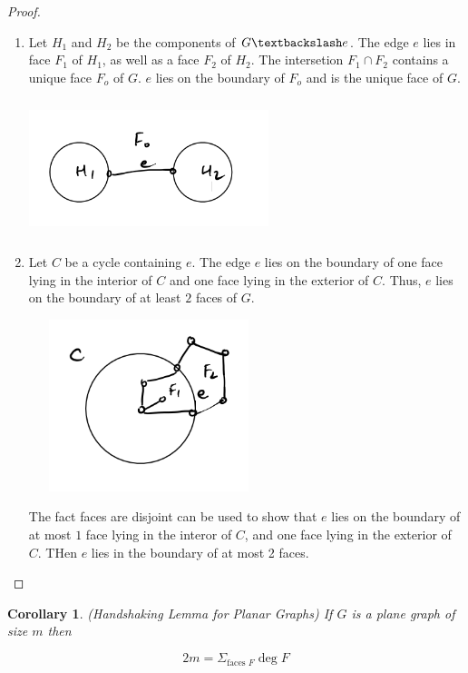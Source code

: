 \documentclass[12pt]{article}
\newtheorem*{corollary}{Corollary}
\newenvironment{pro}{\begin{proof}}{\end{proof}}
\begin{document}
\begin{pro}
\begin{enumerate}
  \item Let $H_{1}$ and $H_{2}$ be the components of $G\textbackslash e$. The edge $e$ lies in face $F_{1}$ of $H_{1}$, as well as a face $F_{2}$ of $H_{2}$.
        The intersetion $F_{1}\cap F_{2}$ contains a unique face $F_{o}$ of $G$. $e$ lies on the boundary of $F_{o}$ and is the unique face of $G$.

        \includegraphics[width=7cm, height=4cm]{proof2}
  \item Let $C$ be a cycle containing $e$. The edge $e$ lies on the boundary of one face lying in the interior of $C$ and one face lying in the exterior of $C$.
        Thus, $e$ lies on the boundary of at least $2$ faces of $G$.

        \includegraphics[width=7cm, height=5cm]{proof2.1}

        The fact faces are disjoint can be used to show that $e$ lies on the boundary of at most $1$ face lying in the interor of $C$, and one face lying in the exterior of $C$. THen $e$ lies in the boundary of at most 2 faces.

\end{enumerate}

\end{pro}



\begin{corollary}

  (Handshaking Lemma for Planar Graphs)
  If $G$ is a plane graph of size $m$ then

  \[2m = \Sigma_{\text{faces } F} \deg  F\]
\end{corollary}
\end{document}
